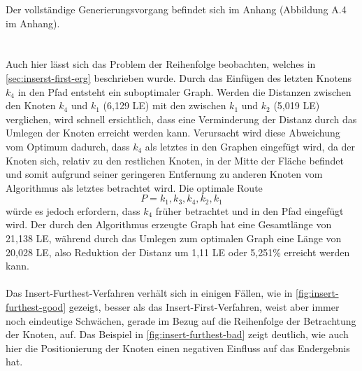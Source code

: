Der vollständige Generierungsvorgang befindet sich im Anhang (Abbildung A.4 im Anhang). \\
\\\\
Auch hier lässt sich das Problem der Reihenfolge beobachten, welches in \vref{sec:inserst-first-erg} beschrieben wurde.
Durch das Einfügen des letzten Knotens $k_4$ in den Pfad entsteht ein suboptimaler Graph.
Werden die Distanzen zwischen den Knoten $k_4$ und $k_1$ (6,129 \ac{LE}) mit den zwischen $k_1$ und $k_2$ (5,019 \ac{LE}) verglichen, wird schnell ersichtlich, dass eine Verminderung der Distanz durch das Umlegen der Knoten erreicht werden kann.
Verursacht wird diese Abweichung vom Optimum dadurch, dass $k_4$ als letztes in den Graphen eingefügt wird, da der Knoten sich, relativ zu den restlichen Knoten, in der Mitte der Fläche befindet und somit aufgrund seiner geringeren Entfernung zu anderen Knoten vom Algorithmus als letztes betrachtet wird.
Die optimale Route
$$P = k_1, k_3, k_4, k_2, k_1$$ 
 würde es jedoch erfordern, dass $k_4$ früher betrachtet und in den Pfad eingefügt wird.
Der durch den Algorithmus erzeugte Graph hat eine Gesamtlänge von 21,138 \ac{LE}, während durch das Umlegen zum optimalen Graph eine Länge von 20,028 \ac{LE}, also Reduktion der Distanz um 1,11 \ac{LE} oder 5,251\% erreicht werden kann.
\\\\
Das Insert-Furthest-Verfahren verhält sich in einigen Fällen, wie in \vref{fig:insert-furthest-good} gezeigt, besser als das Insert-First-Verfahren, weist aber immer noch eindeutige Schwächen, gerade im Bezug auf die Reihenfolge der Betrachtung der Knoten, auf.
Das Beispiel in \vref{fig:insert-furthest-bad} zeigt deutlich, wie auch hier die Positionierung der Knoten einen negativen Einfluss auf das Endergebnis hat.